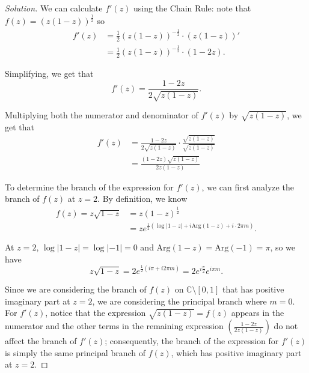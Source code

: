\documentclass[11pt]{article}
\newcommand{\C}{\mathbb{C}}
\newenvironment{solution}
  {\renewcommand\qedsymbol{$\blacksquare$}\begin{proof}[Solution]}
  {\end{proof}}
\theoremstyle{definition}
\begin{document}
\begin{solution}

    We can calculate $f'(z)$ using the Chain Rule: note that $f(z) = (z(1-z))^{\frac{1}{2}}$ so
\begin{align*}
     f'(z) &= \frac{1}{2} (z(1-z))^{-\frac{1}{2}} \cdot (z(1-z))' \\
     &= \frac{1}{2} (z(1-z))^{-\frac{1}{2}} \cdot (1-2z).
\end{align*}

Simplifying, we get that \[ f'(z) = \frac{1-2z}{2\sqrt{z(1-z)}}. \]

Multiplying both the numerator and denominator of $f'(z)$ by $\sqrt{z(1-z)}$, we get that
\begin{align*}
    f'(z) &= \frac{1-2z}{2\sqrt{z(1-z)}} \cdot \frac{\sqrt{z(1-z)}}{\sqrt{z(1-z)}} \\
    &= \frac{(1-2z)\sqrt{z(1-z)}}{2z(1-z)}
\end{align*}

To determine the branch of the expression for $f'(z)$, we can first analyze the branch of $f(z)$ at $z=2$. By definition, we know
\begin{align*}
    f(z) = z\sqrt{1-z} &= z(1-z)^{\frac{1}{2}} \\
    &= ze^{\frac{1}{2} \left(\log |1-z| + i \mathrm{Arg}(1-z) + i\cdot 2\pi m \right)}.
\end{align*}

At $z=2$, $\log |1-z| = \log |-1| = 0$ and $\mathrm{Arg}(1-z) = \mathrm{Arg}(-1) = \pi$, so we have
\[ z\sqrt{1-z} = 2e^{\frac{1}{2} \left(i \pi + i 2\pi m \right)} = 2e^{i \frac{\pi}{2}}e^{i \pi m}. \]

Since we are considering the branch of $f(z)$ on $\C \setminus [0, 1]$ that has positive imaginary part at $z=2$, we are considering the principal branch where $m = 0$. \\

For $f'(z)$, notice that the expression $\sqrt{z(1-z)} = f(z)$ appears in the numerator and the other terms in the remaining expression $\left(\frac{1-2z}{2z(1-z)}\right)$ do not affect the branch of $f'(z)$; consequently, the branch of the expression for $f'(z)$ is simply the same principal branch of $f(z)$, which has positive imaginary part at $z=2$. 
\end{solution}
\end{document}
